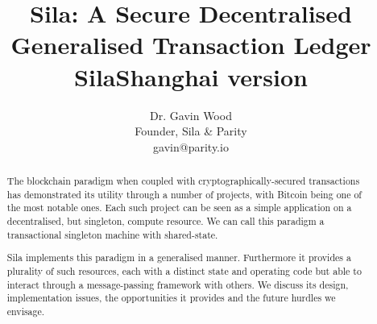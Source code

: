 \documentclass[9pt,oneside]{amsart}
\title[Sila: A Secure Decentralised Generalised Transaction Ledger\\ \smaller \textbf{{SilaShanghai version}}]{Sila: A Secure Decentralised Generalised Transaction Ledger \\ \smaller \textbf{{SilaShanghai version \YellowPaperVersionNumber}}}
\author{
    Dr. Gavin Wood\\
    Founder, Sila \& Parity\\
    gavin@parity.io
}
\begin{document}
\pagecolor{pagecolor}

\begin{abstract}
The blockchain paradigm when coupled with cryptographically-secured transactions has demonstrated its utility through a number of projects, with Bitcoin being one of the most notable ones. Each such project can be seen as a simple application on a decentralised, but singleton, compute resource. We can call this paradigm a transactional singleton machine with shared-state.

Sila implements this paradigm in a generalised manner. Furthermore it provides a plurality of such resources, each with a distinct state and operating code but able to interact through a message-passing framework with others. We discuss its design, implementation issues, the opportunities it provides and the future hurdles we envisage.
\end{abstract}

\maketitle
\end{document}
